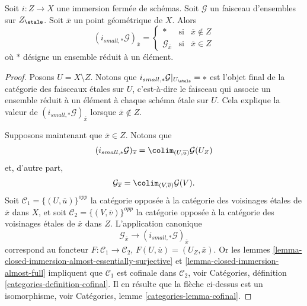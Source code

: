 \begin{lemma}
\label{lemma-stalk-pushforward-closed-immersion}
Soit $i : Z \to X$ une immersion ferm\'ee de sch\'emas.
Soit $\mathcal{G}$ un faisceau d'ensembles sur $Z_\etale$.
Soit $\overline{x}$ un point g\'eom\'etrique de $X$.
Alors
$$
(i_{small, *}\mathcal{G})_{\overline{x}} =
\left\{
\begin{matrix}
* & \text{si} & \overline{x} \not \in Z \\
\mathcal{G}_{\overline{x}} & \text{si} & \overline{x} \in Z
\end{matrix}
\right.
$$
o\`u $*$ d\'esigne un ensemble r\'eduit \`a un \'el\'ement.
\end{lemma}

\begin{proof}
Posons $U = X \setminus Z$.
Notons que $i_{small, *}\mathcal{G}|_{U_\etale} = *$ est l'objet final
de la cat\'egorie des faisceaux \'etales sur $U$, c'est-\`a-dire le faisceau
qui associe un ensemble r\'eduit \`a un \'el\'ement \`a chaque sch\'ema \'etale sur $U$.
Cela explique la valeur de $(i_{small, *}\mathcal{G})_{\overline{x}}$
lorsque $\overline{x} \not \in Z$.

\medskip\noindent
Supposons maintenant que $\overline{x} \in Z$. Notons que
$$
(i_{small, *}\mathcal{G})_{\overline{x}}
=
\colim_{(U, \overline{u})} \mathcal{G}(U_Z)
$$
et, d'autre part,
$$
\mathcal{G}_{\overline{x}}
=
\colim_{(V, \overline{v})} \mathcal{G}(V).
$$
Soit $\mathcal{C}_1 = \{(U, \overline{u})\}^{opp}$ la cat\'egorie oppos\'ee \`a la
cat\'egorie des voisinages \'etales de $\overline{x}$ dans $X$, et soit
$\mathcal{C}_2 = \{(V, \overline{v})\}^{opp}$ la cat\'egorie oppos\'ee \`a la
cat\'egorie des voisinages \'etales de $\overline{x}$ dans $Z$. L'application canonique
$$
\mathcal{G}_{\overline{x}}
\longrightarrow
(i_{small, *}\mathcal{G})_{\overline{x}}
$$
correspond au foncteur $F : \mathcal{C}_1 \to \mathcal{C}_2$,
$F(U, \overline{u}) = (U_Z, \overline{x})$. Or les
lemmes \ref{lemma-closed-immersion-almost-essentially-surjective} et
\ref{lemma-closed-immersion-almost-full}
impliquent que $\mathcal{C}_1$ est cofinale dans $\mathcal{C}_2$, voir
Catégories, définition \ref{categories-definition-cofinal}.
Il en r\'esulte que la fl\`eche ci-dessus est un isomorphisme, voir
Catégories, lemme \ref{categories-lemma-cofinal}.
\end{proof}

